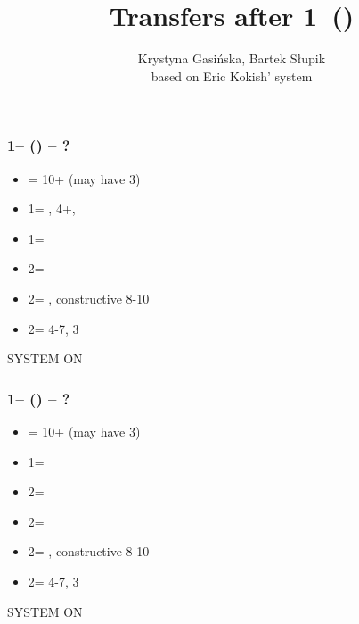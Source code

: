 \documentclass[12pt, a4paper]{article}
\title{Transfers after 1\major\ (\dbl)}
\author{Krystyna Gasińska, Bartek Słupik\\based on Eric Kokish' system}
\begin{document}
\maketitle


\begin{bidpage}
\subsubsection*{1\hearts -- (\dbl) -- ?}
\begin{itemize}
    \item \rdbl = 10+ (may have 3\hearts)
    \item 1\spades = \nat, 4+\spades, \fonce
    \item 1\nt = \trsf{2\clubs}
    \item 2\clubs = \trsf{2\diams}
    \item 2\diams = \trsf{2\hearts}, constructive 8-10
    \item 2\hearts = 4-7, 3\hearts
\end{itemize}
\small{SYSTEM ON}
\end{bidpage}

\begin{bidpage}
\subsubsection*{1\spades -- (\dbl) -- ?}
\begin{itemize}
    \item \rdbl = 10+ (may have 3\spades)
    \item 1\nt = \trsf{ 2\clubs}
    \item 2\clubs = \trsf{2\diams}
    \item 2\diams = \trsf{2\hearts}
    \item 2\hearts = \trsf{2\spades}, constructive 8-10
    \item 2\spades = 4-7, 3\spades
\end{itemize}
\small{SYSTEM ON}
\end{bidpage}

\end{document}
